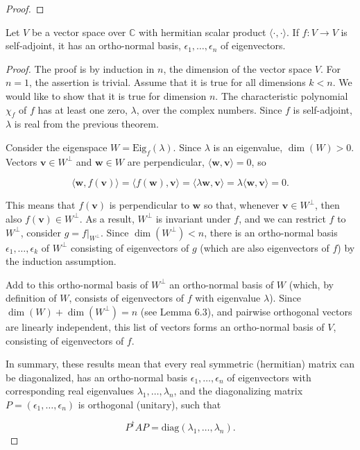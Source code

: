 \documentclass[a4paper,12pt]{report}
\begin{document}
\begin{proof}
\end{proof}

\begin{theorem}
    Let $V$ be a vector space over $\mathbb{C}$ with hermitian scalar product $\langle \cdot, \cdot \rangle$. If $f : V \to V$ is self-adjoint, it has an ortho-normal basis, $\epsilon_1, \ldots, \epsilon_n$ of eigenvectors.
\end{theorem}
    
\begin{proof}
The proof is by induction in $n$, the dimension of the vector space $V$. For $n = 1$, the assertion is trivial. Assume that it is true for all dimensions $k < n$. We would like to show that it is true for dimension $n$. The characteristic polynomial $\chi_f$ of $f$ has at least one zero, $\lambda$, over the complex numbers. Since $f$ is self-adjoint, $\lambda$ is real from the previous theorem. 
    
Consider the eigenspace $W = \text{Eig}_f(\lambda)$. Since $\lambda$ is an eigenvalue, $\dim(W) > 0$. Vectors $\mathbf{v} \in W^\perp$ and $\mathbf{w} \in W$ are perpendicular, $\langle \mathbf{w}, \mathbf{v} \rangle = 0$, so
    
\begin{equation}
    \langle \mathbf{w}, f(\mathbf{v}) \rangle = \langle f(\mathbf{w}), \mathbf{v} \rangle = \langle \lambda \mathbf{w}, \mathbf{v} \rangle = \lambda \langle \mathbf{w}, \mathbf{v} \rangle = 0.
\end{equation}
    
This means that $f(\mathbf{v})$ is perpendicular to $\mathbf{w}$ so that, whenever $\mathbf{v} \in W^\perp$, then also $f(\mathbf{v}) \in W^\perp$. As a result, $W^\perp$ is invariant under $f$, and we can restrict $f$ to $W^\perp$, \ie consider $g = f|_{W^\perp}$. Since $\dim(W^\perp) < n$, there is an ortho-normal basis $\epsilon_1, \ldots, \epsilon_k$ of $W^\perp$ consisting of eigenvectors of $g$ (which are also eigenvectors of $f$) by the induction assumption. 
    
Add to this ortho-normal basis of $W^\perp$ an ortho-normal basis of $W$ (which, by definition of $W$, consists of eigenvectors of $f$ with eigenvalue $\lambda$). Since $\dim(W) + \dim(W^\perp) = n$ (see Lemma 6.3), and pairwise orthogonal vectors are linearly independent, this list of vectors forms an ortho-normal basis of $V$, consisting of eigenvectors of $f$.
    
In summary, these results mean that every real symmetric (hermitian) matrix can be diagonalized, has an ortho-normal basis $\epsilon_1, \ldots, \epsilon_n$ of eigenvectors with corresponding real eigenvalues $\lambda_1, \ldots, \lambda_n$, and the diagonalizing matrix $P = (\epsilon_1, \ldots, \epsilon_n)$ is orthogonal (unitary), such that
    
\begin{equation}
    P^\dagger AP = \text{diag}(\lambda_1, \ldots, \lambda_n).
\end{equation}

\end{proof}
\end{document}
